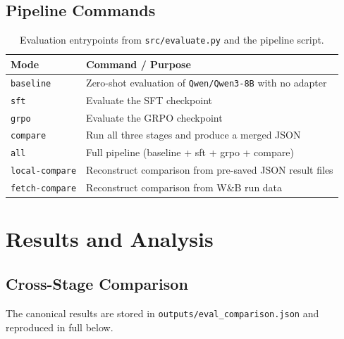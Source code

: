 \documentclass[12pt, a4paper]{article}
\newcommand{\thead}[1]{\textbf{#1}}
\begin{document}
\subsection{Pipeline Commands}

\begin{table}[H]
\centering
\caption{Evaluation entrypoints from \texttt{src/evaluate.py} and the pipeline script.}
\begin{tabularx}{\linewidth}{L{4cm} L{10.2cm}}
\toprule
\thead{Mode} & \thead{Command / Purpose} \\
\midrule
\texttt{baseline} & Zero-shot evaluation of \texttt{Qwen/Qwen3-8B} with no adapter \\
\texttt{sft} & Evaluate the SFT checkpoint \\
\texttt{grpo} & Evaluate the GRPO checkpoint \\
\texttt{compare} & Run all three stages and produce a merged JSON \\
\texttt{all} & Full pipeline (baseline + sft + grpo + compare) \\
\texttt{local-compare} & Reconstruct comparison from pre-saved JSON result files \\
\texttt{fetch-compare} & Reconstruct comparison from W\&B run data \\
\bottomrule
\end{tabularx}
\end{table}

\newpage

\section{Results and Analysis}

\subsection{Cross-Stage Comparison}

The canonical results are stored in \texttt{outputs/eval\_comparison.json}
and reproduced in full below.
\end{document}
